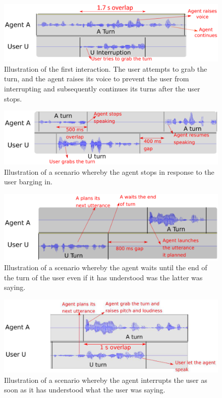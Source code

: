 \documentclass[twocolumn]{svjour3}
\begin{document}
\begin{figure}
  \centering
  \includegraphics[width=\linewidth]{figure/volume_transcript_1_1_refait.eps}
  \caption{Illustration of the first interaction. The user attempts to grab the turn, and the agent raises its voice to prevent the user from interrupting and subsequently continues its turns after the user stops.}
  \label{sc_1}
\end{figure}

\begin{figure}
\centering
\includegraphics[width=\linewidth]{figure/volume_transcript_1_2_refait.eps}
\caption{Illustration of a scenario whereby the agent stops in response to the user barging in.}
\label{sc_2}
\end{figure}

\begin{figure}
\centering
\includegraphics[width=\linewidth]{figure/volume_transcript_2_2_refait.eps}
\caption{Illustration of a scenario whereby the agent waits until the end of the turn of the user even if it has understood was the latter was saying.}
\label{sc_3}
\end{figure}

\begin{figure}
\centering
\includegraphics[width=\linewidth]{figure/volume_transcript_2_1_refait.eps}
\caption{Illustration of a scenario whereby the agent interrupts the user as soon as it has understood what the user was saying.}
\label{sc_4}
\end{figure}
\end{document}
